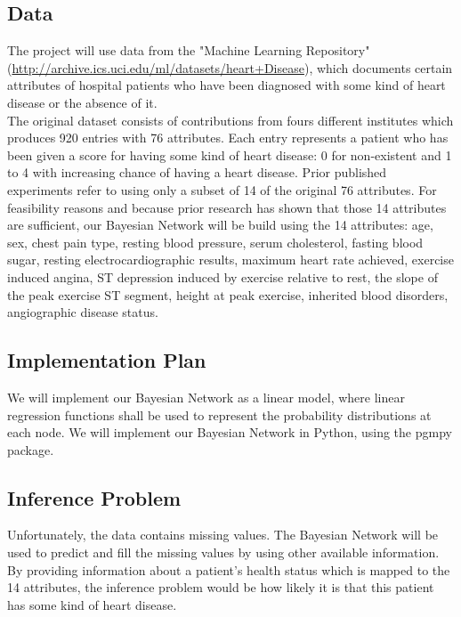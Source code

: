 \documentclass[a4paper]{article}
\begin{document}
\subsection*{Data}

The project will use data from the "Machine Learning Repository" (\url{http://archive.ics.uci.edu/ml/datasets/heart+Disease}), which documents certain attributes of hospital patients who have been diagnosed with some kind of heart disease or the absence of it.\\
The original dataset consists of contributions from fours different institutes which produces 920 entries with 76 attributes. Each entry represents a patient who has been given a score for having some kind of heart disease: 0 for non-existent and 1 to 4 with increasing chance of having a heart disease. Prior published experiments refer to using only a subset of 14 of the original 76 attributes. For feasibility reasons and because prior research has shown that those 14 attributes are sufficient, our Bayesian Network will be build using the 14 attributes: age, sex, chest pain type, resting blood pressure, serum cholesterol, fasting blood sugar, resting electrocardiographic results, maximum heart rate achieved, exercise induced angina, ST depression induced by exercise relative to rest, the slope of the peak exercise ST segment, height at peak exercise, inherited blood disorders, angiographic disease status.


\subsection*{Implementation Plan}

We will implement our Bayesian Network as a linear model, where linear regression functions shall be used to
represent the probability distributions at each node. We will implement our Bayesian Network in Python, using the
pgmpy package.


\subsection*{Inference Problem}

Unfortunately, the data contains missing values. The Bayesian Network will be used to predict and fill the missing values by using other available information. By providing information about a patient's health status which is mapped to the 14 attributes, the inference problem would be how likely it is that this patient has some kind of heart disease.
\end{document}
